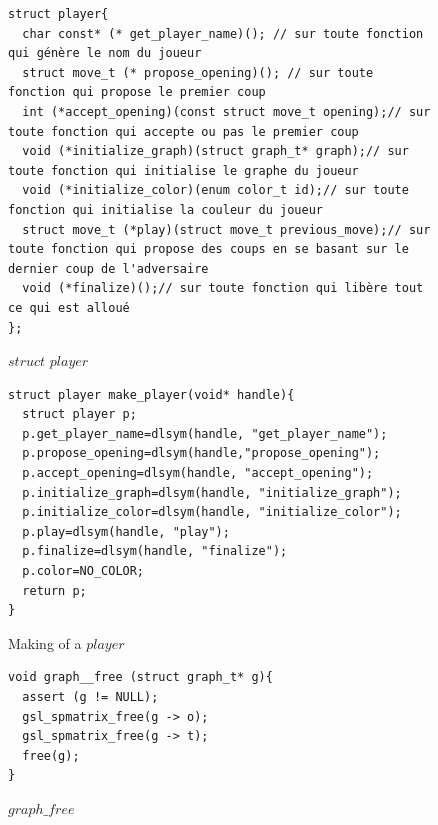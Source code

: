 \documentclass{article}
\begin{document}
\begin{figure}[ht]
    \centering
\begin{lstlisting}
struct player{
  char const* (* get_player_name)(); // sur toute fonction qui génère le nom du joueur
  struct move_t (* propose_opening)(); // sur toute fonction qui propose le premier coup
  int (*accept_opening)(const struct move_t opening);// sur toute fonction qui accepte ou pas le premier coup
  void (*initialize_graph)(struct graph_t* graph);// sur toute fonction qui initialise le graphe du joueur
  void (*initialize_color)(enum color_t id);// sur toute fonction qui initialise la couleur du joueur
  struct move_t (*play)(struct move_t previous_move);// sur toute fonction qui propose des coups en se basant sur le dernier coup de l'adversaire
  void (*finalize)();// sur toute fonction qui libère tout ce qui est alloué 
};
\end{lstlisting}
    \caption{$struct$ $player$}
    \label{fig:player}
\end{figure}

\begin{figure}[ht]
\begin{lstlisting}
struct player make_player(void* handle){
  struct player p;
  p.get_player_name=dlsym(handle, "get_player_name");
  p.propose_opening=dlsym(handle,"propose_opening");
  p.accept_opening=dlsym(handle, "accept_opening");
  p.initialize_graph=dlsym(handle, "initialize_graph");
  p.initialize_color=dlsym(handle, "initialize_color");
  p.play=dlsym(handle, "play");
  p.finalize=dlsym(handle, "finalize");
  p.color=NO_COLOR;
  return p;
}
\end{lstlisting}
    \caption{Making of a $player$}
    \label{fig:making_of_player}
\end{figure}

\begin{figure}[ht]
\begin{lstlisting}
void graph__free (struct graph_t* g){
  assert (g != NULL);
  gsl_spmatrix_free(g -> o);
  gsl_spmatrix_free(g -> t);
  free(g);
}
\end{lstlisting}
    \caption{$graph\_free$}
    \label{fig:free}
\end{figure}
\end{document}
